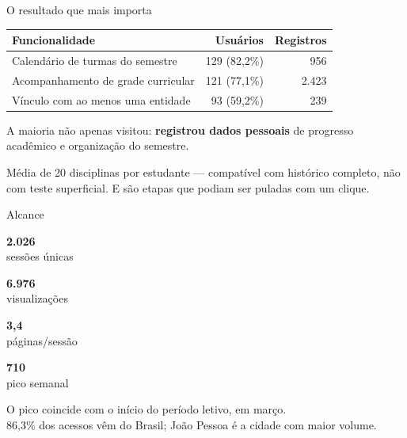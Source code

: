 \documentclass[aspectratio=169,11pt]{beamer}
\newcommand{\destaque}[1]{{\color{azul}\textbf{#1}}}
\newcommand{\nota}[1]{{\footnotesize\color{cinza}#1}}
\newcommand{\bignum}[2]{%
  \begin{minipage}[t]{0.23\textwidth}\centering
  {\color{azul}\fontsize{30}{34}\selectfont\textbf{#1}}\\[0.3em]
  \nota{#2}\end{minipage}}
\begin{document}
\begin{frame}{O resultado que mais importa}
  \vspace{0.4em}
  \centering
  \begin{tabular}{lrr}
    \toprule
    \textbf{Funcionalidade} & \textbf{Usuários} & \textbf{Registros} \\
    \midrule
    Calendário de turmas do semestre   & 129 \; (82,2\%) & 956 \\
    Acompanhamento de grade curricular & 121 \; (77,1\%) & 2.423 \\
    Vínculo com ao menos uma entidade  & 93 \; (59,2\%)  & 239 \\
    \bottomrule
  \end{tabular}
  \vspace{1.4em}

  \pause
  \begin{minipage}{0.86\textwidth}
  A maioria não apenas visitou: \destaque{registrou dados pessoais} de progresso
  acadêmico e organização do semestre.
  \vspace{0.5em}

  \nota{Média de 20 disciplinas por estudante --- compatível com histórico completo,
  não com teste superficial. E são etapas que podiam ser puladas com um clique.}
  \end{minipage}
\end{frame}

\begin{frame}{Alcance}
  \vspace{1.4em}
  \centering
  \bignum{2.026}{sessões únicas} \hfill
  \bignum{6.976}{visualizações} \hfill
  \bignum{3,4}{páginas/sessão} \hfill
  \bignum{710}{pico semanal}
  \vspace{2em}

  \pause
  \nota{O pico coincide com o início do período letivo, em março.\\
  86,3\% dos acessos vêm do Brasil; João Pessoa é a cidade com maior volume.}
\end{frame}
\end{document}
